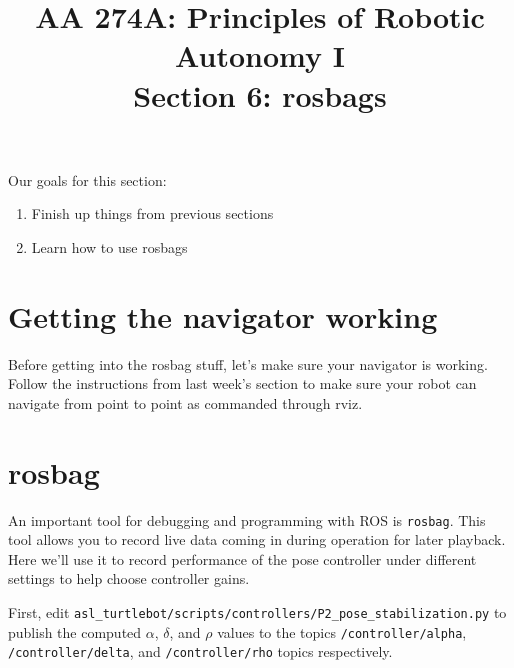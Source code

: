 \documentclass{article}
\title{AA 274A: Principles of Robotic Autonomy I \\Section 6: rosbags}
\date{}
\begin{document}
\maketitle
\pagestyle{fancy}
\vspace{-1.25cm}
Our goals for this section: 
\begin{enumerate}
    \item Finish up things from previous sections
    \item Learn how to use rosbags
\end{enumerate}


\section{Getting the navigator working}
Before getting into the rosbag stuff, let's make sure your navigator is working. Follow the instructions from last week's section to make sure your robot can navigate from point to point as commanded through rviz.

\section{rosbag}
An important tool for debugging and programming with ROS is \texttt{rosbag}. This tool allows you to record live data coming in during operation for later playback. Here we'll use it to record performance of the pose controller under different settings to help choose controller gains.

First, edit \texttt{asl\_turtlebot/scripts/controllers/P2\_pose\_stabilization.py} to publish the computed $\alpha$, $\delta$, and $\rho$ values to the topics \texttt{/controller/alpha}, \texttt{/controller/delta}, and \texttt{/controller/rho} topics respectively. 
\end{document}
